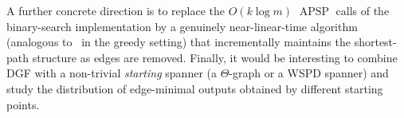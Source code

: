 \documentclass{article}
\DeclareMathOperator{\APSP}{APSP}
\begin{document}
A further concrete direction is to replace the $O(k\log m)$ $\APSP$ calls
of the binary-search implementation by a genuinely near-linear-time
algorithm (analogous to~\cite{GLN02,BCFMS10,ABBB15} in the greedy
setting) that incrementally maintains the shortest-path structure as
edges are removed. Finally, it would be interesting to combine DGF
with a non-trivial \emph{starting} spanner (a $\Theta$-graph or a WSPD
spanner) and study the distribution of edge-minimal outputs obtained
by different starting points.


% 
% 

\end{document}
